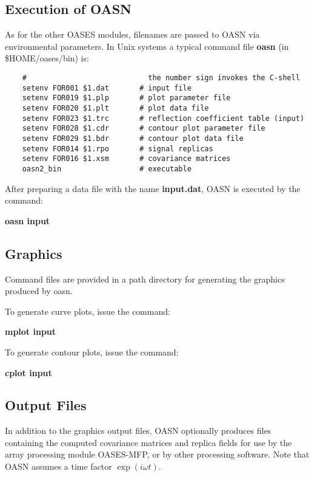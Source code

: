 \subsection{Execution of OASN}

    As  for the other OASES modules,  filenames  are  passed  to OASN   via 
environmental parameters. In Unix systems a typical command  file 
{\bf oasn} (in  \$HOME/oases/bin) is:

\small
\begin{verbatim}
    #                            the number sign invokes the C-shell 
    setenv FOR001 $1.dat       # input file 
    setenv FOR019 $1.plp       # plot parameter file
    setenv FOR020 $1.plt       # plot data file  
    setenv FOR023 $1.trc       # reflection coefficient table (input)
    setenv FOR028 $1.cdr       # contour plot parameter file 
    setenv FOR029 $1.bdr       # contour plot data file 
    setenv FOR014 $1.rpo       # signal replicas
    setenv FOR016 $1.xsm       # covariance matrices
    oasn2_bin                  # executable
\end{verbatim}
\normalsize

    After preparing a data file with the name {\bf input.dat}, OASN  is 
executed by the command:

    {\bf oasn input}

\subsection{Graphics}  

    Command files are provided in a path directory for generating 
the graphics produced by oasn.

\noindent    To generate curve plots, issue the command:

    {\bf mplot input}

\noindent    To generate contour plots, issue the command:

    {\bf cplot input}


\subsection{Output Files}

In addition to the graphics output files, OASN optionally produces
files containing the computed covariance matrices and replica fields
for use by the array processing module OASES-MFP, or by other
processing software. Note that OASN assumes a time factor $ \exp(i
\omega t) $. 


